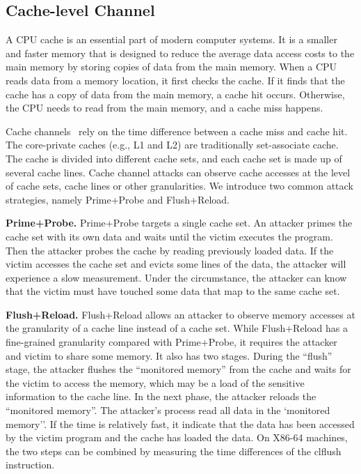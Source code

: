 \subsection{Cache-level Channel}
A CPU cache is an essential part of modern computer systems. It is a smaller and faster memory that is designed to reduce the average data access costs to the main memory by storing copies of data from the main memory. When a CPU reads data from a memory location, it first checks the cache. If it finds that the cache has a copy of data from the main memory, a cache hit occurs. Otherwise, the CPU needs to read from the main memory, and a cache miss happens.

Cache channels~\cite{yarom2017cachebleed,191010,184415,Osvik2006,liu2015last,184415} rely on the time difference between a cache miss and cache hit. The core-private caches (e.g., L1 and L2) are traditionally set-associate cache. The cache is divided into different cache sets, and each cache set is made up of several cache lines. Cache channel attacks can observe cache accesses at the level of cache sets, cache lines or other granularities. We introduce two common attack strategies, namely Prime+Probe and Flush+Reload.

\textbf{Prime+Probe.} Prime+Probe targets a single cache set.
An attacker primes the cache set with its own data and waits until the victim executes the program. Then the attacker probes the cache by reading previously loaded data. If the victim accesses the cache set and evicts some lines of the data, the attacker will experience a slow measurement. Under the circumstance, the attacker can know that the victim must have touched some data that map to the same cache set.

\textbf{Flush+Reload.} Flush+Reload allows an attacker to observe memory accesses at the granularity of a cache line instead of a cache set. While Flush+Reload has a fine-grained granularity compared with Prime+Probe, it requires the attacker and victim to share some memory. It also has two stages. During the ``flush'' stage, the attacker flushes the ``monitored
memory'' from the cache and waits for the victim to access the memory, which may be a load of the sensitive information to the cache line.  In the next phase,
the attacker reloads the ``monitored memory''. The attacker's process read all data in the `monitored
memory''. If the time is relatively fast, it indicate that the data has been accessed by the victim program and the cache has loaded the data. 
On X86-64 machines, the two steps can be combined by measuring the time differences of the \textsf{clflush} instruction.

